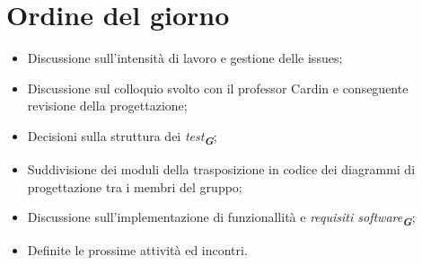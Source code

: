 

\section{Ordine del giorno}

\begin{itemize}
    \item Discussione sull'intensità di lavoro e gestione delle issues;
    \item Discussione sul colloquio svolto con il professor Cardin e conseguente revisione della progettazione;
    \item Decisioni sulla struttura dei \emph{test}\textsubscript{\textit{\textbf{G}}};
    \item Suddivisione dei moduli della trasposizione in codice dei diagrammi di progettazione tra i membri del gruppo;
    \item Discussione sull'implementazione di funzionallità e \emph{requisiti software}\textsubscript{\textit{\textbf{G}}};
    \item Definite le prossime attività ed incontri.
\end{itemize}